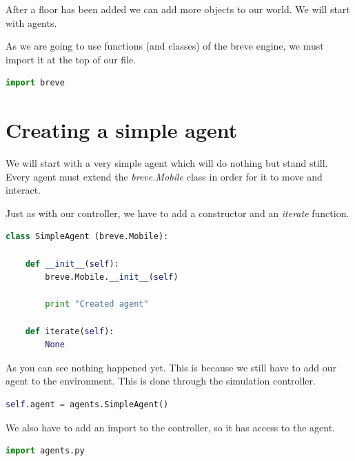 After a floor has been added we can add more objects to our world. We will start with agents.


As we are going to use functions (and classes) of the breve engine, we must import it at the top of our file.

\begin{lstlisting}[language=Python]
import breve
\end{lstlisting}


\section{Creating a simple agent}

We will start with a very simple agent which will do nothing but stand still. Every agent must extend the \textit{breve.Mobile} class in order for it to move and interact.

Just as with our controller, we have to add a constructor and an \textit{iterate} function.

\begin{lstlisting}[language=Python]
class SimpleAgent (breve.Mobile):

	def __init__(self):
		breve.Mobile.__init__(self)

		print "Created agent"

	def iterate(self):
		None
\end{lstlisting}



As you can see nothing happened yet. This is because we still have to add our agent to the environment. This is done through the simulation controller.

\begin{lstlisting}[language=Python]
self.agent = agents.SimpleAgent()
\end{lstlisting}


We also have to add an import to the controller, so it has access to the agent.

\begin{lstlisting}[language=Python]
import agents.py
\end{lstlisting}

